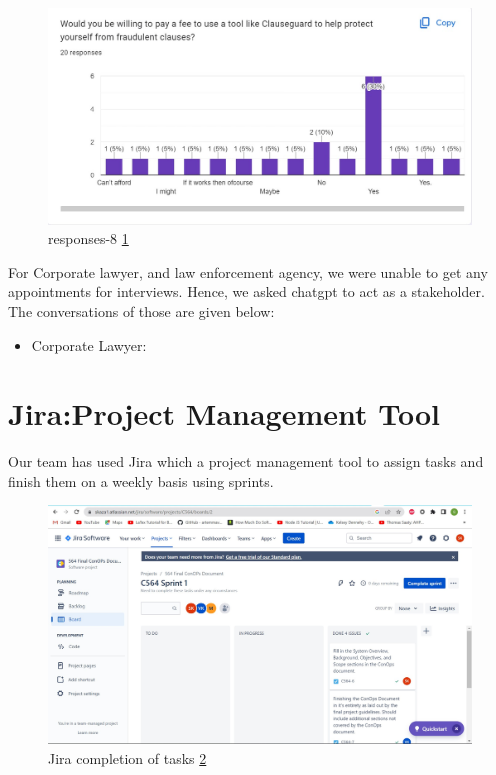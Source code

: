 \begin{figure}[H]
    \centering
    \includegraphics[scale=0.43]{Figures/responses-8.jpg}
    \caption{responses-8 \ref{fig::responses-8}}
    \label{fig::responses-8}
\end{figure}


    For Corporate lawyer, and law enforcement agency, we were unable to get any appointments for interviews. Hence, we asked chatgpt to act as a stakeholder. The conversations of those are given below: 

    \begin{itemize}
        \item Corporate Lawyer: 
    \end{itemize}


    
\section{ Jira:Project Management Tool \label{Jira Project Management Tool} }
Our team has used Jira which a project management tool to assign tasks and finish them on a weekly basis using sprints. 

\begin{figure}[H]
    \centering
    \includegraphics[scale=0.43]{Figures/Jira all completed tasks.jpg}
    \caption{Jira completion of tasks \ref{fig::Jira all completed tasks}}
    \label{fig::Jira all completed tasks}
\end{figure}


